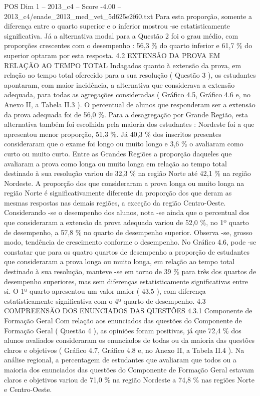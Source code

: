 \begin{textsample}{POS Dim 1 – 2013\_c4 – Score -4.00 – 2013\_c4/enade\_2013\_med\_vet\_5d625e2f60.txt}
Para esta proporção, somente a diferença entre o quarto superior e o inferior mostrou -se estatisticamente significativa.
Já a alternativa modal para a Questão 2 foi o grau médio, com proporções crescentes com o desempenho : 56,3 \% do quarto inferior e 61,7 \% do superior optaram por esta resposta. 4.2 EXTENSÃO DA PROVA EM RELAÇÃO AO TEMPO TOTAL Indagados quanto à extensão da prova, em relação ao tempo total oferecido para a sua resolução ( Questão 3 ), os estudantes apontaram, com maior incidência, a alternativa que considerava a extensão adequada, para todas as agregações consideradas ( Gráfico 4.5, Gráfico 4.6 e, no Anexo II, a Tabela II.3 ).
O percentual de alunos que responderam ser a extensão da prova adequada foi de 56,0 \%.
Para a desagregação por Grande Região, esta alternativa também foi escolhida pela maioria dos estudantes : Nordeste foi a que apresentou menor proporção, 51,3 \%.
Já 40,3 \% dos inscritos presentes consideraram que o exame foi longo ou muito longo e 3,6 \% o avaliaram como curto ou muito curto.
Entre as Grandes Regiões a proporção daqueles que avaliaram a prova como longa ou muito longa em relação ao tempo total destinado à sua resolução variou de 32,3 \% na região Norte até 42,1 \% na região Nordeste.
A proporção dos que consideraram a prova longa ou muito longa na região Norte é significativamente diferente da proporção dos que deram as mesmas respostas nas demais regiões, a exceção da região Centro-Oeste.
Considerando -se o desempenho dos alunos, nota -se ainda que o percentual dos que consideraram a extensão da prova adequada variou de 52,0 \%, no 1º quarto de desempenho, a 57,8 \% no quarto de desempenho superior.
Observa -se, grosso modo, tendência de crescimento conforme o desempenho.
No Gráfico 4.6, pode -se constatar que para os quatro quartos de desempenho a proporção de estudantes que consideraram a prova longa ou muito longa, em relação ao tempo total destinado à sua resolução, manteve -se em torno de 39 \% para três dos quartos de desempenho superiores, mas sem diferenças estatisticamente significativas entre si.
O 1º quarto apresentou um valor maior ( 43,5 ), com diferença estatisticamente significativa com o 4º quarto de desempenho. 4.3 COMPREENSÃO DOS ENUNCIADOS DAS QUESTÕES 4.3.1 Componente de Formação Geral Com relação aos enunciados das questões do Componente de Formação Geral ( Questão 4 ), as opiniões foram positivas, já que 72,4 \% dos alunos avaliados consideraram os enunciados de todas ou da maioria das questões claros e objetivos ( Gráfico 4.7, Gráfico 4.8 e, no Anexo II, a Tabela II.4 ).
Na análise regional, a percentagem de estudantes que avaliaram que todos ou a maioria dos enunciados das questões do Componente de Formação Geral estavam claros e objetivos variou de 71,0 \% na região Nordeste a 74,8 \% nas regiões Norte e Centro-Oeste.

\end{textsample}
